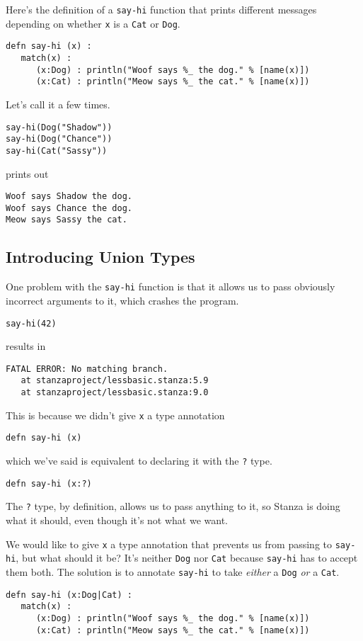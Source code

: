 \documentclass[10pt,oneside]{book}
\begin{document}
Here's the definition of a \texttt{\frenchspacing say-hi} function that prints different messages depending on whether \texttt{\frenchspacing x} is a \texttt{\frenchspacing Cat} or \texttt{\frenchspacing Dog}. 
\begin{lstlisting}
defn say-hi (x) :
   match(x) :
      (x:Dog) : println("Woof says %_ the dog." % [name(x)])
      (x:Cat) : println("Meow says %_ the cat." % [name(x)])
\end{lstlisting}

Let's call it a few times. 
\begin{lstlisting}
say-hi(Dog("Shadow"))
say-hi(Dog("Chance"))
say-hi(Cat("Sassy"))
\end{lstlisting}
prints out
\begin{lstlisting}
Woof says Shadow the dog.
Woof says Chance the dog.
Meow says Sassy the cat.
\end{lstlisting}

\subsection*{Introducing Union Types}
One problem with the \texttt{\frenchspacing say-hi} function is that it allows us to pass obviously incorrect arguments to it, which crashes the program.
\begin{lstlisting}
say-hi(42)
\end{lstlisting}
results in
\begin{lstlisting}
FATAL ERROR: No matching branch.
   at stanzaproject/lessbasic.stanza:5.9
   at stanzaproject/lessbasic.stanza:9.0
\end{lstlisting}

This is because we didn't give \texttt{\frenchspacing x} a type annotation
\begin{lstlisting}
defn say-hi (x)
\end{lstlisting}
which we've said is equivalent to declaring it with the \texttt{\frenchspacing ?} type.
\begin{lstlisting}
defn say-hi (x:?)
\end{lstlisting}
The \texttt{\frenchspacing ?} type, by definition, allows us to pass anything to it, so Stanza is doing what it should, even though it's not what we want.

We would like to give \texttt{\frenchspacing x} a type annotation that prevents us from passing \texttt{} to \texttt{\frenchspacing say-hi}, but what should it be? It's neither \texttt{\frenchspacing Dog} nor \texttt{\frenchspacing Cat} because \texttt{\frenchspacing say-hi} has to accept them both. The solution is to annotate \texttt{\frenchspacing say-hi} to take {\em either} a \texttt{\frenchspacing Dog} {\em or} a \texttt{\frenchspacing Cat}. 
\begin{lstlisting}
defn say-hi (x:Dog|Cat) :
   match(x) :
      (x:Dog) : println("Woof says %_ the dog." % [name(x)])
      (x:Cat) : println("Meow says %_ the cat." % [name(x)])
\end{lstlisting}
\end{document}
